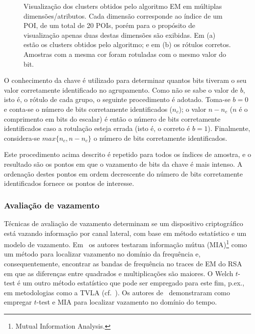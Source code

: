 \begin{figure}
\begin{subfigure}[b]{0.4\textwidth}
		\caption{}
		\label{fig:clusteringCorrectLabels}
	\end{subfigure}	
	\caption{Visualização dos clusters obtidos pelo algoritmo EM em múltiplas dimensões/atributos. Cada dimensão corresponde ao índice de um POI, de um total de 20 POIs, porém para o propósito de visualização apenas duas destas dimensões são exibidas. Em (a) estão os clusters obtidos pelo algoritmo; e em (b) os rótulos corretos. Amostras com a mesma cor foram rotuladas com o mesmo valor do bit.}	
	\label{fig:clustering}
\end{figure}

O conhecimento da chave é utilizado para determinar quantos bits tiveram o seu valor corretamente identificado no agrupamento. Como não se sabe o valor de $b$, isto é, o rótulo de cada grupo, o seguinte procedimento é adotado. Toma-se $b=0$ e conta-se o número de bits corretamente identificados ($n_c$); o valor $n - n_c$ ($n$ é o comprimento em bits do escalar) é então o número de bits corretamente identificados caso a rotulação esteja errada (isto é, o correto é $b=1$). Finalmente, considera-se $max\{n_c, n - n_c\}$ o número de bits corretamente identificados.

Este procedimento acima descrito é repetido para todos os índices de amostra, e o resultado são os pontos em que o vazamento de bits da chave é mais intenso. A ordenação destes pontos em ordem decrescente do número de bits corretamente identificados fornece os pontos de interesse.

\subsubsection{Avaliação de vazamento} %

Técnicas de avaliação de vazamento determinam se um dispositivo criptográfico está vazando informação por canal lateral, com base em método estatístico e um modelo de vazamento. 
Em~\cite{Meynard2011} os autores testaram informação mútua (MIA)\footnote{Mutual Information Analysis.} como um método para localizar vazamento no domínio da frequência e, consequentemente, encontrar as bandas de frequência no traces de EM do RSA em que as diferenças entre quadrados e multiplicações são maiores. O Welch $t$-test é um outro método estatístico que pode ser empregado para este fim, p.ex., em metodologias como a TVLA (cf.~). Os autores de~\cite{MatherOswaldBandenburg2013} demonstraram como empregar $t$-test e MIA para localizar vazamento no domínio do tempo.

